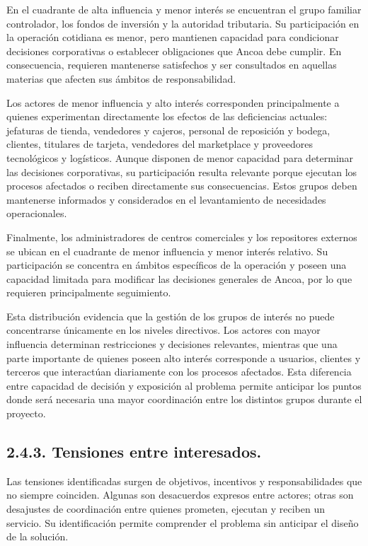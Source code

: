\documentclass[11pt]{article}
\begin{document}
En el cuadrante de alta influencia y menor interés se encuentran el grupo familiar controlador, los fondos de inversión y la autoridad tributaria. Su participación en la operación cotidiana es menor, pero mantienen capacidad para condicionar decisiones corporativas o establecer obligaciones que Ancoa debe cumplir. En consecuencia, requieren mantenerse satisfechos y ser consultados en aquellas materias que afecten sus ámbitos de responsabilidad.

Los actores de menor influencia y alto interés corresponden principalmente a quienes experimentan directamente los efectos de las deficiencias actuales: jefaturas de tienda, vendedores y cajeros, personal de reposición y bodega, clientes, titulares de tarjeta, vendedores del marketplace y proveedores tecnológicos y logísticos. Aunque disponen de menor capacidad para determinar las decisiones corporativas, su participación resulta relevante porque ejecutan los procesos afectados o reciben directamente sus consecuencias. Estos grupos deben mantenerse informados y considerados en el levantamiento de necesidades operacionales.

Finalmente, los administradores de centros comerciales y los repositores externos se ubican en el cuadrante de menor influencia y menor interés relativo. Su participación se concentra en ámbitos específicos de la operación y poseen una capacidad limitada para modificar las decisiones generales de Ancoa, por lo que requieren principalmente seguimiento.

Esta distribución evidencia que la gestión de los grupos de interés no puede concentrarse únicamente en los niveles directivos. Los actores con mayor influencia determinan restricciones y decisiones relevantes, mientras que una parte importante de quienes poseen alto interés corresponde a usuarios, clientes y terceros que interactúan diariamente con los procesos afectados. Esta diferencia entre capacidad de decisión y exposición al problema permite anticipar los puntos donde será necesaria una mayor coordinación entre los distintos grupos durante el proyecto.

\subsection{2.4.3. Tensiones entre interesados.}\label{tensiones-entre-interesados.}

Las tensiones identificadas surgen de objetivos, incentivos y responsabilidades que no siempre coinciden. Algunas son desacuerdos expresos entre actores; otras son desajustes de coordinación entre quienes prometen, ejecutan y reciben un servicio. Su identificación permite comprender el problema sin anticipar el diseño de la solución.
\end{document}
